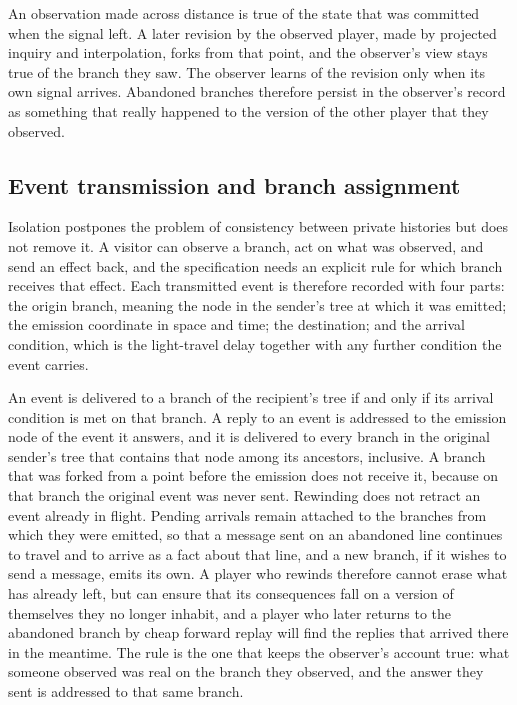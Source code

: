 \documentclass[11pt]{article}
\begin{document}
An observation made across distance is true of the state that was committed when the signal left. A later revision by the observed player, made by projected inquiry and interpolation, forks from that point, and the observer's view stays true of the branch they saw. The observer learns of the revision only when its own signal arrives. Abandoned branches therefore persist in the observer's record as something that really happened to the version of the other player that they observed.

\subsection{Event transmission and branch assignment}

Isolation postpones the problem of consistency between private histories but does not remove it. A visitor can observe a branch, act on what was observed, and send an effect back, and the specification needs an explicit rule for which branch receives that effect. Each transmitted event is therefore recorded with four parts: the origin branch, meaning the node in the sender's tree at which it was emitted; the emission coordinate in space and time; the destination; and the arrival condition, which is the light-travel delay together with any further condition the event carries.

An event is delivered to a branch of the recipient's tree if and only if its arrival condition is met on that branch. A reply to an event is addressed to the emission node of the event it answers, and it is delivered to every branch in the original sender's tree that contains that node among its ancestors, inclusive. A branch that was forked from a point before the emission does not receive it, because on that branch the original event was never sent. Rewinding does not retract an event already in flight. Pending arrivals remain attached to the branches from which they were emitted, so that a message sent on an abandoned line continues to travel and to arrive as a fact about that line, and a new branch, if it wishes to send a message, emits its own. A player who rewinds therefore cannot erase what has already left, but can ensure that its consequences fall on a version of themselves they no longer inhabit, and a player who later returns to the abandoned branch by cheap forward replay will find the replies that arrived there in the meantime. The rule is the one that keeps the observer's account true: what someone observed was real on the branch they observed, and the answer they sent is addressed to that same branch.
\end{document}

